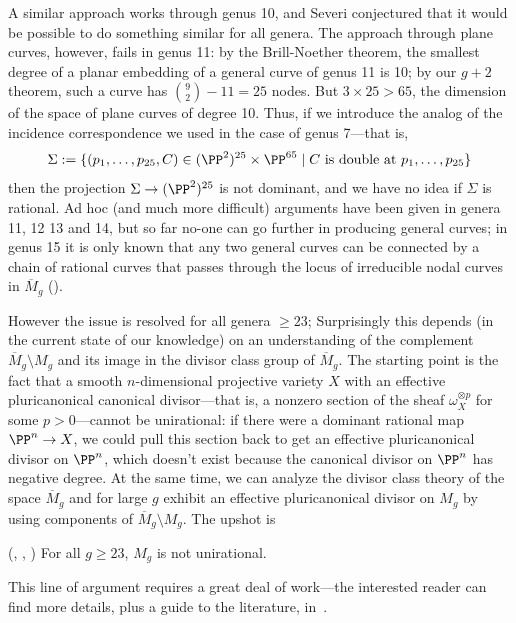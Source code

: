 A similar approach works through genus 10, and Severi conjectured that it would be possible to do something similar for all genera. The approach through plane curves, however, fails in genus 11: by the Brill-Noether theorem, the smallest degree of a planar embedding of a general curve of genus 11 is 10; by our $g+2$ theorem, such a curve has ${9\choose 2}-11 = 25$ nodes. But $3 \times 25 > 65$, the dimension of the space of plane curves of degree 10. Thus, if we introduce the analog of the incidence correspondence we used in the case of genus 7---that is,
$$
\Sigma := \{ (p_1,\dots,p_{25},C) \in (\PP^2)^{25} \times \PP^{65} \mid C \text{ is double at } p_1,\dots,p_{25} \}
$$
then the projection $\Sigma \to (\PP^2)^{25}$ is not dominant, and we have no idea if $\Sigma$ is rational.
 Ad hoc (and much more difficult) arguments have been given in genera 11, 12 13 and 14, but so far no-one can go further in producing general curves; in genus 15 it is only known that
 any two general curves can be connected by a chain of rational curves that passes through
 the locus of irreducible nodal curves in $\overline M_{g}$ (\cite{MR2202246}).
 
However the issue is resolved for all genera $\geq 23$; Surprisingly this depends (in the current state of our knowledge) on an understanding of the complement
$\overline M_{g}\setminus M_{g}$ and its image in the divisor class group of $\overline M_{g}$. The starting point is the fact that a smooth $n$-dimensional projective variety $X$ with an effective pluricanonical canonical divisor---that is, a nonzero section of the sheaf $\omega_{X}^{\otimes p}$ for some $p>0$---cannot be unirational: if there were a dominant rational map $\PP^n \to X$, we could pull this section back to get an effective pluricanonical divisor on $\PP^n$, which doesn't exist because
the canonical divisor on $\PP^{n}$ has negative degree. At the same time, we can analyze the divisor class theory of the space $\overline M_g$ and for large $g$ exhibit an effective pluricanonical divisor on $M_g$ by using components of  $\overline M_{g}\setminus M_{g}$. 
The upshot is 
\begin{theorem}(\cite{Harris-MumfordModuli}, \cite{HarrisModuli}, \cite{Eisenbud-HarrisModuli})
For all $g \geq 23$, $M_g$ is not unirational.
\end{theorem}
This line of argument requires a great deal of work---the interested reader can find more details, plus a guide to the literature, in~\cite{MR1631825}.

